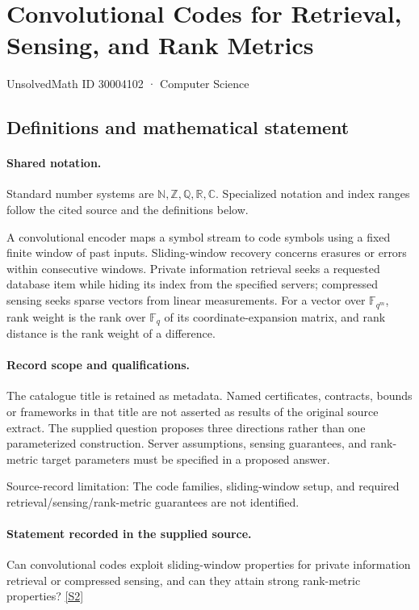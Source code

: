 \documentclass[11pt]{article}
\newcommand{\sref}[2]{\hyperlink{source:#1:#2}{[S#2]}}
\begin{document}
\setcounter{section}{30004101}
\section{Convolutional Codes for Retrieval, Sensing, and Rank Metrics}\label{30004102}
{\small\sffamily UnsolvedMath ID 30004102 · Computer Science}
\subsection{Definitions and mathematical statement}

\paragraph{Shared notation.}Standard number systems are $\mathbb N,\mathbb Z,\mathbb Q,\mathbb R,\mathbb C$. Specialized notation and index ranges follow the cited source and the definitions below.


A convolutional encoder maps a symbol stream to code symbols using a fixed finite window of past inputs. Sliding-window recovery concerns erasures or errors within consecutive windows. Private information retrieval seeks a requested database item while hiding its index from the specified servers; compressed sensing seeks sparse vectors from linear measurements. For a vector over $\mathbb F_{q^m}$, rank weight is the rank over $\mathbb F_q$ of its coordinate-expansion matrix, and rank distance is the rank weight of a difference.
\paragraph{Record scope and qualifications.}
The catalogue title is retained as metadata. Named certificates, contracts, bounds or frameworks in that title are not asserted as results of the original source extract.
The supplied question proposes three directions rather than one parameterized construction. Server assumptions, sensing guarantees, and rank-metric target parameters must be specified in a proposed answer.

Source-record limitation: The code families, sliding-window setup, and required retrieval/sensing/rank-metric guarantees are not identified.
\paragraph{Statement recorded in the supplied source.}
Can convolutional codes exploit sliding-window properties for private information retrieval or compressed sensing, and can they attain strong rank-metric properties? \sref{30004102}{2}
\end{document}
